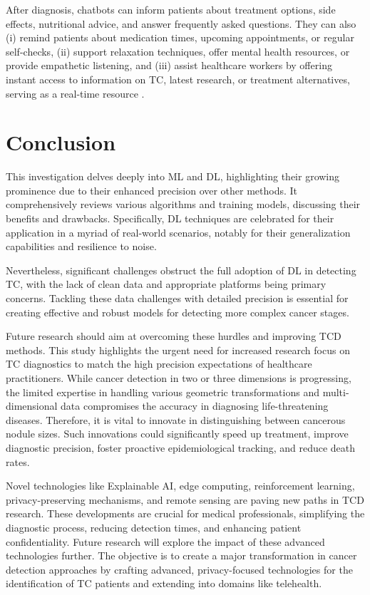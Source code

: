 \documentclass[a4paper,fleqn]{cas-sc}
\begin{document}
After diagnosis, chatbots can inform patients about treatment options, side effects, nutritional advice, and answer frequently asked questions. They can also (i) remind patients about medication times, upcoming appointments, or regular self-checks, (ii) support relaxation techniques, offer mental health resources, or provide empathetic listening, and (iii) assist healthcare workers by offering instant access to information on TC, latest research, or treatment alternatives, serving as a real-time resource \cite{sorin2023large}.

\section{Conclusion}  \label{sec9}
This investigation delves deeply into \ac{ML} and \ac{DL}, highlighting their growing prominence due to their enhanced precision over other methods. It comprehensively reviews various algorithms and training models, discussing their benefits and drawbacks. Specifically, \ac{DL} techniques are celebrated for their application in a myriad of real-world scenarios, notably for their generalization capabilities and resilience to noise.

Nevertheless, significant challenges obstruct the full adoption of \ac{DL} in detecting TC, with the lack of clean data and appropriate platforms being primary concerns. Tackling these data challenges with detailed precision is essential for creating effective and robust models for detecting more complex cancer stages.

Future research should aim at overcoming these hurdles and improving \ac{TCD} methods. This study highlights the urgent need for increased research focus on TC diagnostics to match the high precision expectations of healthcare practitioners. While cancer detection in two or three dimensions is progressing, the limited expertise in handling various geometric transformations and multi-dimensional data compromises the accuracy in diagnosing life-threatening diseases. Therefore, it is vital to innovate in distinguishing between cancerous nodule sizes. Such innovations could significantly speed up treatment, improve diagnostic precision, foster proactive epidemiological tracking, and reduce death rates.

Novel technologies like Explainable AI, edge computing, reinforcement learning, privacy-preserving mechanisms, and remote sensing are paving new paths in \ac{TCD} research. These developments are crucial for medical professionals, simplifying the diagnostic process, reducing detection times, and enhancing patient confidentiality. Future research will explore the impact of these advanced technologies further. The objective is to create a major transformation in cancer detection approaches by crafting advanced, privacy-focused technologies for the identification of TC patients and extending into domains like telehealth.







\end{document}
